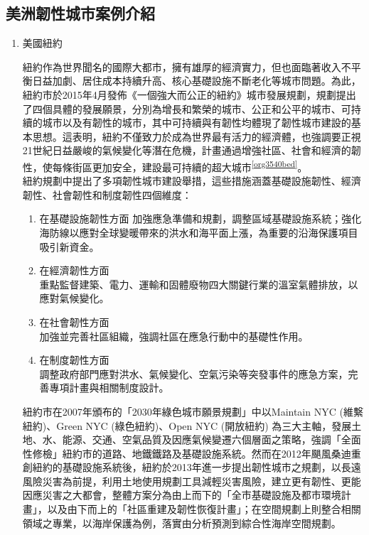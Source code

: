 \documentclass[a4paper,12pt]{article}
\begin{document}
\subsection{美洲韌性城市案例介紹}
\label{sec:org203bda2}
\begin{enumerate}
\item 美國紐約
\label{sec:org06340c8}

紐約作為世界聞名的國際大都市，擁有雄厚的經濟實力，但也面臨著收入不平衡日益加劇、居住成本持續升高、核心基礎設施不斷老化等城市問題。為此，紐約市於2015年4月發佈《一個強大而公正的紐約》城市發展規劃，規劃提出了四個具體的發展願景，分別為增長和繁榮的城市、公正和公平的城市、可持續的城市以及有韌性的城市，其中可持續與有韌性均體現了韌性城市建設的基本思想。這表明，紐約不僅致力於成為世界最有活力的經濟體，也強調要正視21世紀日益嚴峻的氣候變化等潛在危機，計畫通過增強社區、社會和經濟的韌性，使每條街區更加安全，建設最可持續的超大城市\textsuperscript{\ref{org3540bed}}。\\

紐約規劃中提出了多項韌性城市建設舉措，這些措施涵蓋基礎設施韌性、經濟韌性、社會韌性和制度韌性四個維度：\\
\begin{enumerate}
\item 在基礎設施韌性方面 加強應急準備和規劃，調整區域基礎設施系統；強化海防線以應對全球變暖帶來的洪水和海平面上漲，為重要的沿海保護項目吸引新資金。\\
\item 在經濟韌性方面\\
重點監督建築、電力、運輸和固體廢物四大關鍵行業的溫室氣體排放，以應對氣候變化。\\
\item 在社會韌性方面\\
加強並完善社區組織，強調社區在應急行動中的基礎性作用。\\
\item 在制度韌性方面\\
調整政府部門應對洪水、氣候變化、空氣污染等突發事件的應急方案，完善專項計畫與相關制度設計。\\
\end{enumerate}

紐約市在2007年頒布的「2030年綠色城市願景規劃」中以Maintain NYC (維繫紐約)、Green NYC (綠色紐約)、Open NYC (開放紐約) 為三大主軸，發展土地、水、能源、交通、空氣品質及因應氣候變遷六個層面之策略，強調「全面性修檢」紐約市的道路、地鐵鐵路及基礎設施系統。然而在2012年颶風桑迪重創紐約的基礎設施系統後，紐約於2013年進⼀步提出韌性城市之規劃，以⻑遠風險災害為前提，利用土地使用規劃工具減輕災害風險，建立更有韌性、更能因應災害之大都會，整體方案分為由上而下的「全市基礎設施及都市環境計畫」，以及由下而上的「社區重建及韌性恢復計畫」；在空間規劃上則整合相關領域之專業，以海岸保護為例，落實由分析預測到綜合性海岸空間規劃。\\


\end{enumerate}
\end{document}
